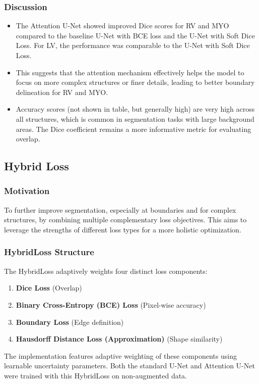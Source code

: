 \documentclass{article}
\begin{document}
\subsubsection{Discussion}
\begin{itemize}
  \item The Attention U-Net showed improved Dice scores for RV and MYO compared to the baseline U-Net with BCE loss and the U-Net with Soft Dice Loss. For LV, the performance was comparable to the U-Net with Soft Dice Loss.
  \item This suggests that the attention mechanism effectively helps the model to focus on more complex structures or finer details, leading to better boundary delineation for RV and MYO.
  \item Accuracy scores (not shown in table, but generally high) are very high across all structures, which is common in segmentation tasks with large background areas. The Dice coefficient remains a more informative metric for evaluating overlap.
\end{itemize}

\subsection{Hybrid Loss}
\subsubsection{Motivation}
To further improve segmentation, especially at boundaries and for complex structures, by combining multiple complementary loss objectives. This aims to leverage the strengths of different loss types for a more holistic optimization.

\subsubsection{HybridLoss Structure}
The HybridLoss adaptively weights four distinct loss components:
\begin{enumerate}
  \item \textbf{Dice Loss} (Overlap)
  \item \textbf{Binary Cross-Entropy (BCE) Loss} (Pixel-wise accuracy)
  \item \textbf{Boundary Loss} (Edge definition)
  \item \textbf{Hausdorff Distance Loss (Approximation)} (Shape similarity)
\end{enumerate}
The implementation features adaptive weighting of these components using learnable uncertainty parameters. Both the standard U-Net and Attention U-Net were trained with this HybridLoss on non-augmented data.
\end{document}
